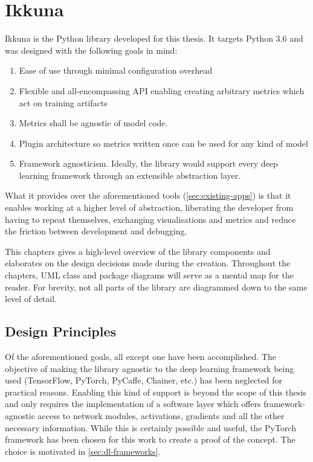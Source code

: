 \hypertarget{ikkuna}{%
\chapter{Ikkuna}\label{ikkuna}}

Ikkuna is the Python library developed for this thesis. It targets
Python 3.6 and was designed with the following goals in mind:

\begin{enumerate}
    \item
        Ease of use through minimal configuration overhead
    \item
        Flexible and all-encompassing API enabling creating arbitrary metrics
        which act on training artifacts
    \item
        Metrics shall be agnostic of model code.
    \item
        Plugin architecture so metrics written once can be used for any kind
        of model
    \item
        Framework agnosticism. Ideally, the library would support every deep
        learning framework through an extensible abstraction layer.
\end{enumerate}

What it provides over the aforementioned tools (\cref{sec:existing-apps}) is that it enables
working at a higher level of abstraction, liberating the developer from
having to repeat themselves, exchanging visualisations and metrics and
reduce the friction between development and debugging.

This chapters gives a
high-level overview of the library components and elaborates on the design
decisions made during the creation. Throughout the chapters, UML class and
package diagrams will serve as a mental map for the reader. For brevity, not all
parts of the library are diagrammed down to the same level of detail.

\hypertarget{design-principles}{%
\section{Design Principles}\label{design-principles}}

Of the aforementioned goals, all except one have been accomplished. The
objective of making the library agnostic to the deep learning framework
being used (TensorFlow, PyTorch, PyCaffe, Chainer, etc.) has been
neglected for practical reasons. Enabling this kind of support is beyond
the scope of this thesis and only requires the implementation of a
software layer which offers framework-agnostic access to network
modules, activations, gradients and all the other necessary information.
While this is certainly possible and useful, the PyTorch framework has
been chosen for this work to create a proof of the concept. The choice is
motivated in \cref{sec:dl-frameworks}.

